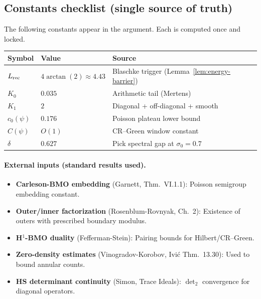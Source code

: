 \documentclass[11pt]{article}
\theoremstyle{definition}
\theoremstyle{remark}
\theoremstyle{definition}
\begin{document}
\subsection*{Constants checklist (single source of truth)}

The following constants appear in the argument. Each is computed once and locked.

\begin{center}
\begin{tabular}{lll}
\toprule
\textbf{Symbol} & \textbf{Value} & \textbf{Source} \\
\midrule
$L_{\rm rec}$ & $4\arctan(2) \approx 4.43$ & Blaschke trigger (Lemma~\ref{lem:energy-barrier}) \\
$K_0$ & $0.035$ & Arithmetic tail (Mertens) \\
$K_1$ & $2$ & Diagonal + off-diagonal + smooth \\
$c_0(\psi)$ & $0.176$ & Poisson plateau lower bound \\
$C(\psi)$ & $O(1)$ & CR--Green window constant \\
$\delta$ & $0.627$ & Pick spectral gap at $\sigma_0 = 0.7$ \\
\bottomrule
\end{tabular}
\end{center}

\paragraph{External inputs (standard results used).}
\begin{itemize}
\item \textbf{Carleson-BMO embedding} (Garnett, Thm.~VI.1.1): Poisson semigroup embedding constant.
\item \textbf{Outer/inner factorization} (Rosenblum-Rovnyak, Ch.~2): Existence of outers with prescribed boundary modulus.
\item \textbf{H$^1$-BMO duality} (Fefferman-Stein): Pairing bounds for Hilbert/CR--Green.
\item \textbf{Zero-density estimates} (Vinogradov-Korobov, Ivi\'c Thm.~13.30): Used to bound annular counts.
\item \textbf{HS determinant continuity} (Simon, Trace Ideals): $\det_2$ convergence for diagonal operators.
\end{itemize}
\end{document}
